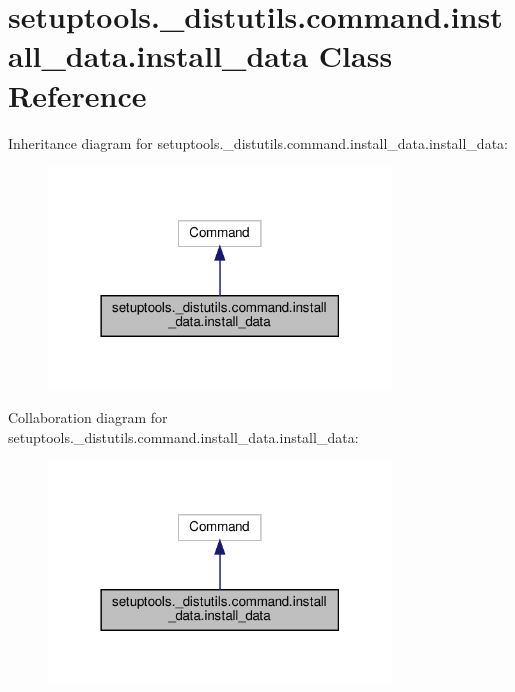 \hypertarget{classsetuptools_1_1__distutils_1_1command_1_1install__data_1_1install__data}{}\section{setuptools.\+\_\+distutils.\+command.\+install\+\_\+data.\+install\+\_\+data Class Reference}
\label{classsetuptools_1_1__distutils_1_1command_1_1install__data_1_1install__data}


Inheritance diagram for setuptools.\+\_\+distutils.\+command.\+install\+\_\+data.\+install\+\_\+data\+:
\nopagebreak
\begin{figure}[H]
\begin{center}
\leavevmode
\includegraphics[width=258pt]{classsetuptools_1_1__distutils_1_1command_1_1install__data_1_1install__data__inherit__graph}
\end{center}
\end{figure}


Collaboration diagram for setuptools.\+\_\+distutils.\+command.\+install\+\_\+data.\+install\+\_\+data\+:
\nopagebreak
\begin{figure}[H]
\begin{center}
\leavevmode
\includegraphics[width=258pt]{classsetuptools_1_1__distutils_1_1command_1_1install__data_1_1install__data__coll__graph}
\end{center}
\end{figure}
